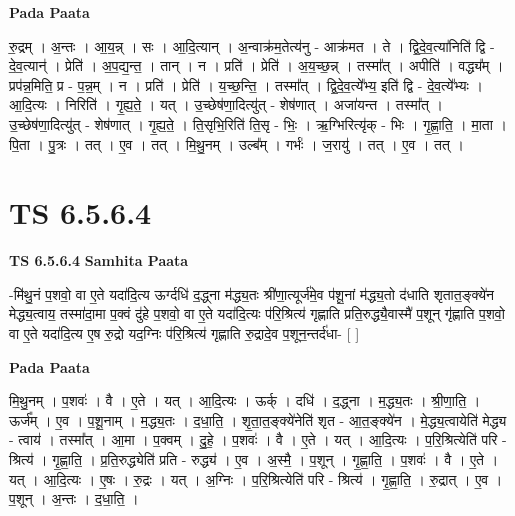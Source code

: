 \documentclass[17pt]{extarticle}
\begin{document}
\textbf{Pada Paata} \newline

रु॒द्रम् । अ॒न्तः । आ॒य॒न्न् । सः । आ॒दि॒त्यान् । अ॒न्वाक्र॑म॒तेत्य॑नु - आक्र॑मत । ते । द्वि॒दे॒व॒त्या॑निति॑ द्वि - दे॒व॒त्यान्॑ । प्रेति॑ । अ॒प॒द्य॒न्त॒ । तान् । न । प्रति॑ । प्रेति॑ । अ॒य॒च्छ॒न्न् । तस्मा᳚त् । अपीति॑ । वद्ध्य᳚म् । प्रप॑न्न॒मिति॒ प्र - प॒न्न॒म् । न । प्रति॑ । प्रेति॑ । य॒च्छ॒न्ति॒ । तस्मा᳚त् । द्वि॒दे॒व॒त्ये᳚भ्य॒ इति॑ द्वि - दे॒व॒त्ये᳚भ्यः । आ॒दि॒त्यः । निरिति॑ । गृ॒ह्य॒ते॒ । यत् । उ॒च्छेष॑णा॒दित्यु॑त् - शेष॑णात् । अजा॑यन्त । तस्मा᳚त् । उ॒च्छेष॑णा॒दित्यु॑त् - शेष॑णात् । गृ॒ह्य॒ते॒ । ति॒सृभि॒रिति॑ ति॒सृ - भिः॒ । ऋ॒ग्भिरित्यृ॑क् - भिः । गृ॒ह्णा॒ति॒ । मा॒ता । पि॒ता । पु॒त्रः । तत् । ए॒व । तत् । मि॒थु॒नम् । उल्ब᳚म् । गर्भः॑ । ज॒रायु॑ । तत् । ए॒व । तत् ।  \newline





\section{ TS 6.5.6.4 }

\textbf{TS 6.5.6.4 } \newline
\textbf{Samhita Paata} \newline

-मि॑थु॒नं प॒शवो॒ वा ए॒ते यदा॑दि॒त्य ऊर्ग्दधि॑ द॒द्ध्ना म॑द्ध्य॒तः श्री॑णा॒त्यूर्ज॑मे॒व प॑शू॒नां म॑द्ध्य॒तो द॑धाति शृतात॒ङ्क्ये॑न मेद्ध्य॒त्वाय॒ तस्मा॑दा॒मा प॒क्वं दु॑हे प॒शवो॒ वा ए॒ते यदा॑दि॒त्यः प॑रि॒श्रित्य॑ गृह्णाति प्रति॒रुद्ध्यै॒वास्मै॑ प॒शून् गृ॑ह्णाति प॒शवो॒ वा ए॒ते यदा॑दि॒त्य ए॒ष रु॒द्रो यद॒ग्निः प॑रि॒श्रित्य॑ गृह्णाति रु॒द्रादे॒व प॒शून॒न्तर्द॑धा- [  ] \newline

\textbf{Pada Paata} \newline

मि॒थु॒नम् । प॒शवः॑ । वै । ए॒ते । यत् । आ॒दि॒त्यः । ऊर्क् । दधि॑ । द॒द्ध्ना । म॒द्ध्य॒तः । श्री॒णा॒ति॒ । ऊर्ज᳚म् । ए॒व । प॒शू॒नाम् । म॒द्ध्य॒तः । द॒धा॒ति॒ । शृ॒ता॒त॒ङ्क्ये॑नेति॑ शृत - आ॒त॒ङ्क्ये॑न । मे॒द्ध्य॒त्वायेति॑ मेद्ध्य - त्वाय॑ । तस्मा᳚त् । आ॒मा । प॒क्वम् । दु॒हे॒ । प॒शवः॑ । वै । ए॒ते । यत् । आ॒दि॒त्यः । प॒रि॒श्रित्येति॑ परि - श्रित्य॑ । गृ॒ह्णा॒ति॒ । प्र॒ति॒रुद्ध्येति॑ प्रति - रुद्ध्य॑ । ए॒व । अ॒स्मै॒ । प॒शून् । गृ॒ह्णा॒ति॒ । प॒शवः॑ । वै । ए॒ते । यत् । आ॒दि॒त्यः । ए॒षः । रु॒द्रः । यत् । अ॒ग्निः । प॒रि॒श्रित्येति॑ परि - श्रित्य॑ । गृ॒ह्णा॒ति॒ । रु॒द्रात् । ए॒व । प॒शून् । अ॒न्तः । द॒धा॒ति॒ ।  \newline
\end{document}
